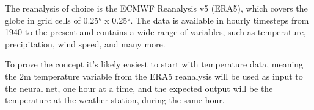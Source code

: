 
The reanalysis of choice is the ECMWF Reanalysis v5 (ERA5), which covers the globe in grid cells of 0.25° x 0.25°. The data is available in hourly timesteps from 1940 to the present and contains a wide range of variables, such as temperature, precipitation, wind speed, and many more.


To prove the concept it's likely easiest to start with temperature data, meaning the 2m temperature variable from the ERA5 reanalysis will be used as input to the neural net, one hour at a time, and the expected output will be the temperature at the weather station, during the same hour.